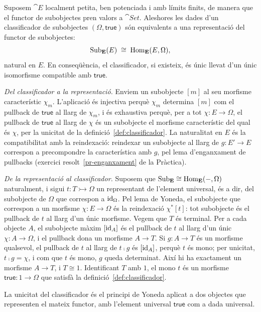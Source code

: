 \begin{proposicio}
\label{prop:omega-representa}
Suposem $\cat{E}$ localment petita, ben potenciada i amb límits finits, de manera que el functor de subobjectes pren valors a $\cat{Set}$. Aleshores les dades d'un classificador de subobjectes $(\Omega,\mathsf{true})$ són equivalents a una representació del functor de subobjectes:
\[
\operatorname{Sub}_{\mathbf{E}}(E)\;\cong\;\operatorname{Hom}_{\mathbf{E}}(E,\Omega),
\]
natural en $E$. En conseqüència, el classificador, si existeix, és únic llevat d'un únic isomorfisme compatible amb $\mathsf{true}$.
\end{proposicio}

\begin{prova}
\emph{Del classificador a la representació.} Enviem un subobjecte $[m]$ al seu morfisme característic $\chi_m$. L'aplicació és injectiva perquè $\chi_m$ determina $[m]$ com el pullback de $\mathsf{true}$ al llarg de $\chi_m$, i és exhaustiva perquè, per a tot $\chi\colon E\to\Omega$, el pullback de $\mathsf{true}$ al llarg de $\chi$ és un subobjecte el morfisme característic del qual és $\chi$, per la unicitat de la definició~\ref{def:classificador}. La naturalitat en $E$ és la compatibilitat amb la reindexació: reindexar un subobjecte al llarg de $g\colon E'\to E$ correspon a precompondre la característica amb $g$, pel lema d'enganxament de pullbacks (exercici resolt~\ref{pr-enganxament} de la Pràctica).

\emph{De la representació al classificador.} Suposem que $\operatorname{Sub}_{\mathbf{E}}\cong\operatorname{Hom}_{\mathbf{E}}(-,\Omega)$ naturalment, i sigui $t\colon T\rightarrowtail\Omega$ un representant de l'element universal, és a dir, del subobjecte de $\Omega$ que correspon a $\operatorname{id}_\Omega$. Pel lema de Yoneda, el subobjecte que correspon a un morfisme $\chi\colon E\to\Omega$ és la reindexació $\chi^{*}[t]$: tot subobjecte és el pullback de $t$ al llarg d'un únic morfisme. Vegem que $T$ és terminal. Per a cada objecte $A$, el subobjecte màxim $[\operatorname{id}_A]$ és el pullback de $t$ al llarg d'un únic $\chi\colon A\to\Omega$, i el pullback dona un morfisme $A\to T$. Si $g\colon A\to T$ és un morfisme qualsevol, el pullback de $t$ al llarg de $t\comp g$ és $[\operatorname{id}_A]$, perquè $t$ és mono; per unicitat, $t\comp g=\chi$, i com que $t$ és mono, $g$ queda determinat. Així hi ha exactament un morfisme $A\to T$, i $T\cong 1$. Identificant $T$ amb $1$, el mono $t$ és un morfisme $\mathsf{true}\colon 1\to\Omega$ que satisfà la definició~\ref{def:classificador}.

La unicitat del classificador és el principi de Yoneda aplicat a dos objectes que representen el mateix functor, amb l'element universal $\mathsf{true}$ com a dada universal.
\end{prova}

